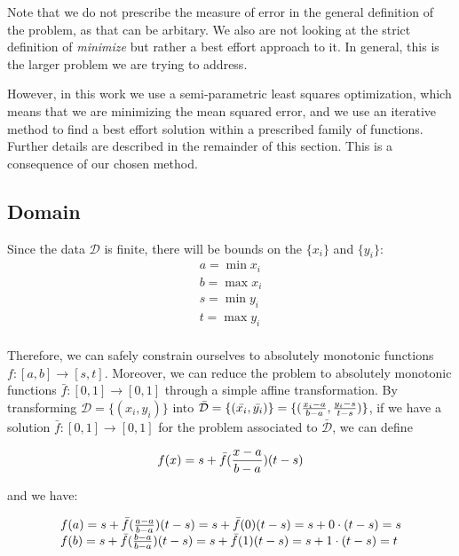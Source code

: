 \documentclass[12pt,a4paper]{article}
\begin{document}
Note that we do not prescribe the measure of error in the general definition of the problem, as that can be arbitary. We also are not looking at the strict definition of {\emph{minimize}} but rather a best effort approach to it. In general, this is the larger problem we are trying to address.

However, in this work we use a semi-parametric least squares optimization, which means that we are minimizing the mean squared error, and we use an iterative method to find a best effort solution within a prescribed family of functions. Further details are described in the remainder of this section. This is a consequence of our chosen method.

\subsection{Domain}

Since the data $\mathcal{D}$ is finite, there will be bounds on the $\{x_i\}$ and $\{y_i\}$: 
\begin{equation}
\begin{array}{l}
a = \min x_i\\
b = \max x_i\\
s = \min y_i\\
t = \max y_i\\
\end{array}
\end{equation}

Therefore, we can safely constrain ourselves to absolutely monotonic functions $f: [a,b] \rightarrow [s, t]$. Moreover, we can reduce the problem to absolutely monotonic functions $\bar{f}: [0,1] \rightarrow [0,1]$ through a simple affine transformation. By transforming $\mathcal{D} = \{(x_i,y_i)\}$ into $\bar{\mathcal{D}} = \{(\bar{x_i},\bar{y_i})\} = \{({{x_i - a} \over {b - a}},{{y_i - s} \over {t - s}})\}$, if we have a solution $\bar{f}: [0,1] \rightarrow [0,1]$ for the problem associated to $\bar{\mathcal{D}}$, we can define

\begin{equation}
f(x) = s + \bar{f}({{x - a} \over {b - a}}) (t - s)
\end{equation}

\noindent and we have:

\begin{equation}
\begin{array}{l}
f(a) = s + \bar{f}({{a-a} \over {b-a}}) (t - s) = s + \bar{f}(0) (t - s) = s + 0 \cdot (t -s) = s\\ 
f(b) = s + \bar{f}({{b-a} \over {b-a}}) (t - s) = s + \bar{f}(1) (t-s) = s + 1 \cdot (t-s) = t\\
\end{array}
\end{equation}
\end{document}
